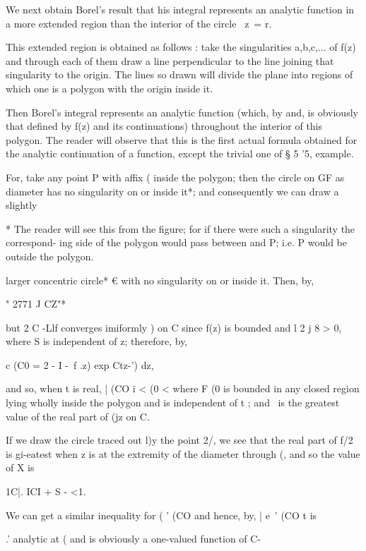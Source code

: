 {We next obtain Borel's result that his integral represents an analytic
function in a more extended region than the interior of the circle \
z\ = r.

This extended region is obtained as follows : take the singularities
a,b,c,... of f(z) and through each of them draw a line perpendicular
to the line joining that singularity to the origin. The lines so drawn
will divide the plane into regions of which one is a polygon with the
origin inside it.

Then Borel's integral represents an analytic function (which, by
and\hardsectionref{7}{8}, is obviously that defined by f(z) and its continuations)
throughout the interior of this polygon. The reader will observe that
this is the first actual formula obtained for the analytic
continuation of a function, except the trivial one of § 5 '5, example.

For, take any point P with affix ( inside the polygon; then the circle
on GF as diameter has no singularity on or inside it*; and
consequently we can draw a slightly

* The reader will see this from the figure; for if there were such a
singularity the correspond- ing side of the polygon would pass between
and P; i.e. P would be outside the polygon.
%
%

larger concentric circle* € with no singularity on or inside it. Then,
by\hardsectionref{5}{4},

" 2771 J CZ"*

but 2 C -Llf converges imiformly ) on C since f(z) is bounded
and l 2 j 8 > 0, where S is independent of z; therefore, by\hardsectionref{4}{7},

c (C0 = 2 - I -\ f .z) exp Ctz-') dz,

and so, when t is real, | (CO i < (0 < where F (0 is bounded in any
closed region lying wholly inside the polygon and is independent of t
; and \ is the greatest value of the real part of (jz on C.

If we draw the circle traced out l)y the point 2/, we see that the
real part of f/2 is gi-eatest when z is at the extremity of the
diameter through (, and so the value of X is

1C|. ICI + S - <1.

We can get a similar inequality for ( ' (CO and hence, by, |
e~' (CO t is

.' analytic at ( and is obviously a one-valued function of C-

}
